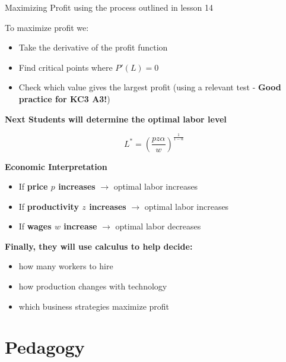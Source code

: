 \documentclass[dvipsnames]{beamer}
\begin{document}
\begin{frame}{Maximizing Profit using the process outlined in lesson 14}

To maximize profit we:

\begin{itemize}
\item Take the derivative of the profit function
\item Find critical points where $P'(L)=0$
\item Check which value gives the largest profit (using a relevant test - \textbf{Good practice for KC3 A3!})
\end{itemize}

\bigskip

\textbf{Next Students will determine the optimal labor level}

\[
L^*=\left(\frac{pz\alpha}{w}\right)^{\frac{1}{1-\alpha}}
\]

\bigskip

\textbf{Economic Interpretation}

\begin{itemize}
\item If \textbf{price $p$ increases} $\rightarrow$ optimal labor increases
\item If \textbf{productivity $z$ increases} $\rightarrow$ optimal labor increases
\item If \textbf{wages $w$ increase} $\rightarrow$ optimal labor decreases
\end{itemize}

\bigskip
\end{frame}
\begin{frame}
\textbf{Finally, they will use calculus to help decide:}

\begin{itemize}
\item how many workers to hire
\item how production changes with technology
\item which business strategies maximize profit
\end{itemize}

\end{frame}
\section{Pedagogy}
\end{document}
